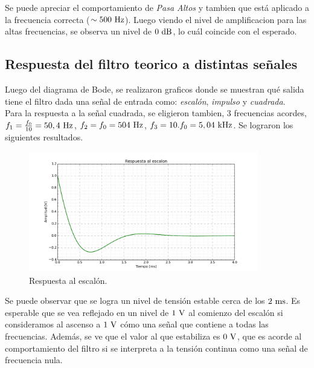 Se puede apreciar el comportamiento de \textit{Pasa Altos} y tambien que est\'a aplicado a la frecuencia correcta ($\sim 500\ \si{\hertz}$). Luego viendo el nivel de amplificacion para las altas frecuencias, se observa un nivel de $0 \dB$, lo cu\'al coincide con el esperado.

\subsection*{Respuesta del filtro teorico a distintas señales}

Luego del diagrama de Bode, se realizaron graficos donde se muestran qu\'e salida tiene el filtro dada una señal de entrada como: \textit{escal\'on}, \textit{impulso} y \textit{cuadrada}.\\

Para la respuesta a la señal cuadrada, se eligieron tambien,  3 frecuencias acordes, $f_1 = \frac{f_0}{10}=50,4 \ \si{\hertz}$, $f_2 = f_0 = 504\ \si{\hertz}$, $f_3 = 10.f_0= 5,04 \ \si{\kilo\hertz}$.
Se lograron los siguientes resultados.\\


\begin{figure}[hbt]
	\centering
	\includegraphics[width=10cm]{imagenes/Step}
	\caption{Respuesta al escal\'on.}
\end{figure}
Se puede observar que se logra un nivel de tensi\'on estable cerca de los $2 \ \si{\milli\second}$. Es esperable que se vea reflejado en un nivel de $1\ \si{\volt}$ al comienzo del escal\'on si consideramos al ascenso a $1\ \si{\volt}$  c\'omo una señal que contiene a todas las frecuencias. Adem\'as, se ve que el valor al que estabiliza es $0 \ \si{\volt}$, que es acorde al comportamiento del filtro si se interpreta a la tensi\'on continua como una señal de frecuencia nula.\\

